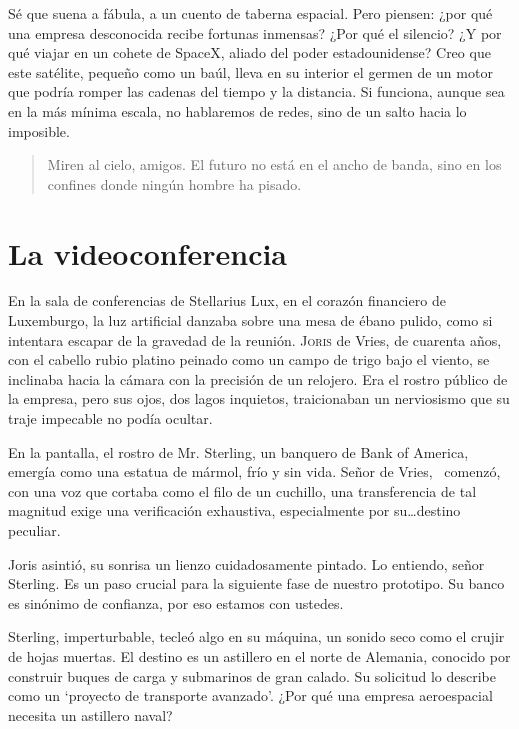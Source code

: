 Sé que suena a fábula, a un cuento de taberna espacial. Pero piensen: ¿por qué una empresa desconocida recibe fortunas inmensas? ¿Por qué el silencio? ¿Y por qué viajar en un cohete de SpaceX, aliado del poder estadounidense? Creo que este satélite, pequeño como un baúl, lleva en su interior el germen de un motor que podría romper las cadenas del tiempo y la distancia. Si funciona, aunque sea en la más mínima escala, no hablaremos de redes, sino de un salto hacia lo imposible.

\begin{quote}
\calli
Miren al cielo, amigos. El futuro no está en el ancho de banda, sino en los confines donde ningún hombre ha pisado.
\end{quote}

\chapter{La videoconferencia}

En la sala de conferencias de Stellarius Lux, en el corazón financiero de Luxemburgo, la luz artificial danzaba sobre una mesa de ébano pulido, como si intentara escapar de la gravedad de la reunión. \lettrine[lines=2, loversize=0.3, lraise=0]{J}{oris} de Vries, de cuarenta años, con el cabello rubio platino peinado como un campo de trigo bajo el viento, se inclinaba hacia la cámara con la precisión de un relojero. Era el rostro público de la empresa, pero sus ojos, dos lagos inquietos, traicionaban un nerviosismo que su traje impecable no podía ocultar.

En la pantalla, el rostro de Mr. Sterling, un banquero de Bank of America, emergía como una estatua de mármol, frío y sin vida. \glqq Señor de Vries,\grqq~ comenzó, con una voz que cortaba como el filo de un cuchillo, \glqq una transferencia de tal magnitud exige una verificación exhaustiva, especialmente por su\ldots destino peculiar.\grqq

Joris asintió, su sonrisa un lienzo cuidadosamente pintado. \glqq Lo entiendo, señor Sterling. Es un paso crucial para la siguiente fase de nuestro prototipo. Su banco es sinónimo de confianza, por eso estamos con ustedes.\grqq

Sterling, imperturbable, tecleó algo en su máquina, un sonido seco como el crujir de hojas muertas. \glqq El destino es un astillero en el norte de Alemania, conocido por construir buques de carga y submarinos de gran calado. Su solicitud lo describe como un `proyecto de transporte avanzado'. ¿Por qué una empresa aeroespacial necesita un astillero naval?\grqq

